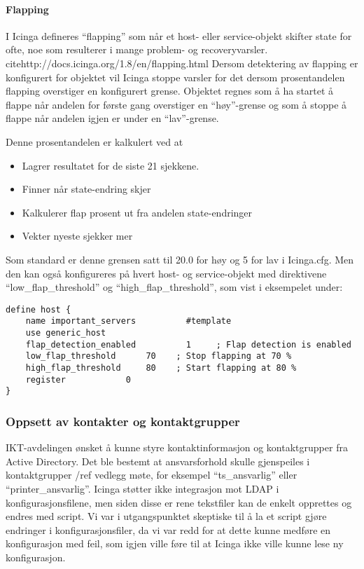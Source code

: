 
\paragraph{Flapping}

I Icinga defineres “flapping” som når et host- eller service-objekt skifter state for ofte, noe som resulterer i mange problem- og recoveryvarsler. cite{http://docs.icinga.org/1.8/en/flapping.html} Dersom detektering av flapping er konfigurert for objektet vil Icinga stoppe varsler for det dersom prosentandelen flapping overstiger en konfigurert grense. Objektet regnes som å ha startet å flappe når andelen for første gang overstiger en “høy”-grense og som å stoppe å flappe når andelen igjen er under en “lav”-grense.

Denne prosentandelen er kalkulert ved at
\begin{itemize}
	\item Lagrer resultatet for de siste 21 sjekkene.
	\item Finner når state-endring skjer 
	\item Kalkulerer flap prosent ut fra andelen state-endringer
	\item Vekter nyeste sjekker mer
\end{itemize}

Som standard er denne grensen satt til 20.0 for høy og 5 for lav i Icinga.cfg. Men den kan også konfigureres på hvert host- og service-objekt med direktivene “low\_flap\_threshold” og “high\_flap\_threshold”, som vist i eksempelet under:

\begin{lstlisting}
define host {
	name important_servers  		#template
	use generic_host
	flap_detection_enabled          1     ; Flap detection is enabled
	low_flap_threshold		70    ; Stop flapping at 70 %
	high_flap_threshold		80    ; Start flapping at 80 %
	register			0
}
\end{lstlisting}

\subsubsection{Oppsett av kontakter og kontaktgrupper}


IKT-avdelingen ønsket å kunne styre kontaktinformasjon og kontaktgrupper fra Active Directory. Det ble bestemt at ansvarsforhold skulle gjenspeiles i kontaktgrupper /ref {vedlegg møte}, for eksempel “ts\_ansvarlig” eller “printer\_ansvarlig”. Icinga støtter ikke integrasjon mot LDAP i konfigurasjonsfilene, men siden disse er rene tekstfiler kan de enkelt opprettes og endres med script. Vi var i utgangspunktet skeptiske til å la et script gjøre endringer i konfigurasjonsfiler, da vi var redd for at dette kunne medføre en konfigurasjon med feil, som igjen ville føre til at Icinga ikke ville kunne lese ny konfigurasjon. 

